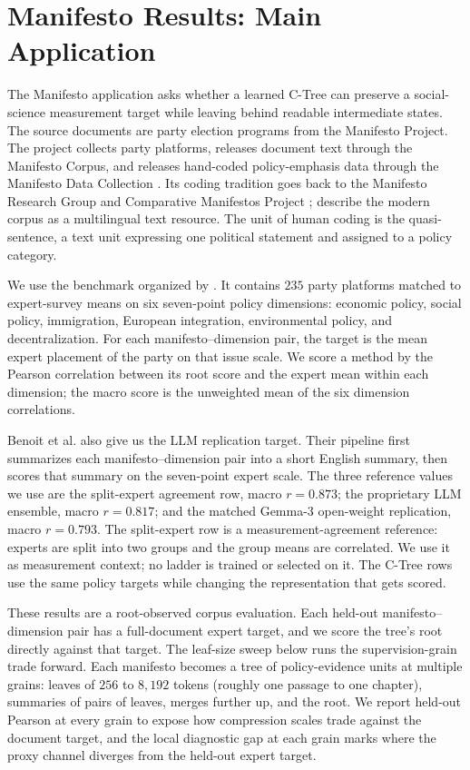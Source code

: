 \section{Manifesto Results: Main Application}
\label{sec:v8-manifesto-results}

The Manifesto application asks whether a learned C-Tree can preserve
a social-science measurement target while leaving behind readable
intermediate states. The source documents are party election
programs from the Manifesto Project. The project collects party
platforms, releases document text through the Manifesto Corpus, and
releases hand-coded policy-emphasis data through the Manifesto Data
Collection
\citep{ManifestoProject2025a,ManifestoCorpus2025}. Its coding tradition goes
back to the Manifesto Research Group and Comparative Manifestos Project
\citep{BudgeRobertsonHearl1987,BudgeEtAl2001,KlingemannEtAl2006,VolkensEtAl2013};
\citet{MerzEtAl2016} describe the modern corpus as a multilingual text
resource. The unit of human coding is the quasi-sentence, a text unit
expressing one political statement and assigned to a policy category.

We use the benchmark organized by \citet{BenoitEtAl2025}. It
contains \(235\) party platforms matched to expert-survey means on
six seven-point policy dimensions: economic policy, social policy,
immigration, European integration, environmental policy, and
decentralization. For each manifesto--dimension pair, the target is
the mean expert placement of the party on that issue scale. We
score a method by the Pearson correlation between its root score
and the expert mean within each dimension; the macro score is the
unweighted mean of the six dimension correlations.

Benoit et al. also give us the LLM replication target. Their
pipeline first summarizes each manifesto--dimension pair into a
short English summary, then scores that summary on the seven-point
expert scale. The three reference values we use are the
split-expert agreement row, macro \(r=0.873\); the proprietary
LLM ensemble, macro \(r=0.817\); and the matched Gemma-3
open-weight replication, macro \(r=0.793\). The split-expert row is
a measurement-agreement reference: experts are split into two
groups and the group means are correlated. We use it as
measurement context; no ladder is trained or selected on it. The
C-Tree rows use the same policy targets while changing the
representation that gets scored.

These results are a root-observed corpus evaluation. Each held-out
manifesto--dimension pair has a full-document expert target, and we
score the tree's root directly against that target. The leaf-size
sweep below runs the supervision-grain trade forward. Each
manifesto becomes a tree of policy-evidence units at multiple
grains: leaves of $256$ to $8{,}192$ tokens (roughly one passage to
one chapter), summaries of pairs of leaves, merges further up, and
the root. We report held-out Pearson at every grain to expose how
compression scales trade against the document target, and the local
diagnostic gap at each grain marks where the proxy channel diverges
from the held-out expert target.

